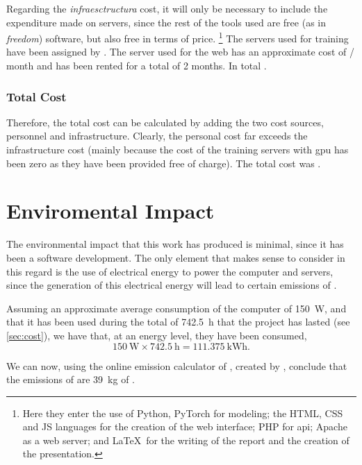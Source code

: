 Regarding the \emph{infraesctructura} cost, it will only be necessary to
include the expenditure made on servers, since the rest of the tools used are
free (as in \emph{freedom}) software, but also free in terms of
price. \footnote{Here they enter the use of Python, PyTorch for modeling; the
  HTML, CSS and JS languages for the creation of the web interface; PHP for
  \gls{api}; Apache as a web server; and \LaTeX \ for the writing of the report
  and the creation of the presentation.} The servers used for training have
been assigned by . The
server used for the web has an approximate cost of  / month and has
been rented for a total of 2 months. In total .

\subsubsection{Total Cost}

Therefore, the total cost can be calculated by adding the two cost sources,
personnel and infrastructure. Clearly, the personal cost far exceeds the
infrastructure cost (mainly because the cost of the training servers with
\gls{gpu} has been zero as they have been provided free of charge). The total
cost was .



\section{Enviromental Impact} \label{sec:enviromental}

The environmental impact that this work has produced is minimal, since it has
been a software development. The only element that makes sense to consider in
this regard is the use of electrical energy to power the computer and servers,
since the generation of this electrical energy will lead to certain emissions
of .

Assuming an approximate average consumption of the computer of \SI{150}{\watt},
and that it has been used during the total of \SI{742.5}{\hour} that the
project has lasted (see \vref{sec:cost}), we have that, at an energy level,
they have been consumed,
\begin{equation}
  \SI{150}{\watt} \times \SI{742.5}{\hour} = \SI{111.375}{\kWh}.
\end{equation}

We can now, using the online emission calculator of , created by
, conclude that the emissions of  are
\SI{39}{\kg} of .

